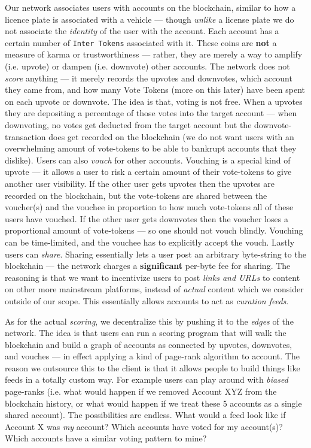 \documentclass[a4paper]{article}
\begin{document}
Our network associates users with accounts on the blockchain, similar to how a licence plate is associated with a vehicle ---  though \emph{unlike} a license plate we do not associate the \emph{identity} of the user with the account. Each account has a certain number of \verb|Inter Tokens| associated with it. These coins are \textbf{not} a measure of karma or trustworthiness ---  rather, they are merely a way to amplify (i.e. upvote) or dampen (i.e. downvote) other accounts. The network does not \emph{score} anything ---  it merely records the upvotes and downvotes, which account they came from, and how many Vote Tokens (more on this later) have been spent on each upvote or downvote. The idea is that, voting is not free. When a upvotes they are depositing a percentage of those votes into the target account ---  when downvoting, no votes get deducted from the target account but the downvote-transaction does get recorded on the blockchain (we do not want users with an overwhelming amount of vote-tokens to be able to bankrupt accounts that they dislike). Users can also \emph{vouch} for other accounts. Vouching is a special kind of upvote ---  it allows a user to risk a certain amount of their vote-tokens to give another user visibility. If the other user gets upvotes then the upvotes are recorded on the blockchain, but the vote-tokens are shared between the voucher(s) and the vouchee in proportion to how much vote-tokens all of these users have vouched. If the other user gets downvotes then the voucher loses a proportional amount of vote-tokens ---  so one should not vouch blindly. Vouching can be time-limited, and the vouchee has to explicitly accept the vouch. Lastly users can \emph{share}. Sharing essentially lets a user post an arbitrary byte-string to the blockchain ---  the network charges a \textbf{significant} per-byte fee for sharing. The reasoning is that we want to incentivize users to post \emph{links and URLs} to content on other more mainstream platforms, instead of \emph{actual} content which we consider outside of our scope. This essentially allows accounts to act as \emph{curation feeds}.

As for the actual \emph{scoring}, we decentralize this by pushing it to the \emph{edges} of the network. The idea is that users can run a scoring program that will walk the blockchain and build a graph of accounts as connected by upvotes, downvotes, and vouches ---  in effect applying a kind of page-rank algorithm to account. The reason we outsource this to the client is that it allows people to build things like feeds in a totally custom way. For example users can play around with \emph{biased} page-ranks (i.e. what would happen if we removed Account XYZ from the blockchain history, or what would happen if we treat these 5 accounts as a single shared account). The possibilities are endless. What would a feed look like if Account X was \emph{my} account? Which accounts have voted for my account(s)? Which accounts have a similar voting pattern to mine?
\end{document}
